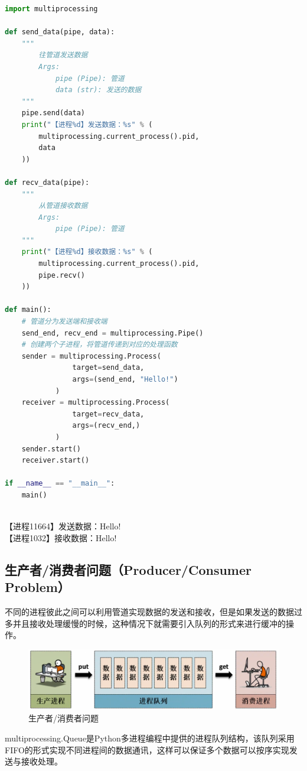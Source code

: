 \begin{lstlisting}[language=Python]
import multiprocessing

def send_data(pipe, data):
	"""
		往管道发送数据
		Args:
			pipe (Pipe): 管道
			data (str): 发送的数据
	"""
	pipe.send(data)
	print("【进程%d】发送数据：%s" % (
		multiprocessing.current_process().pid,
		data
	))

def recv_data(pipe):
	"""
		从管道接收数据
		Args:
			pipe (Pipe): 管道
	"""
	print("【进程%d】接收数据：%s" % (
		multiprocessing.current_process().pid, 
		pipe.recv()
	))

def main():
	# 管道分为发送端和接收端
	send_end, recv_end = multiprocessing.Pipe()
	# 创建两个子进程，将管道传递到对应的处理函数
	sender = multiprocessing.Process(
				target=send_data,
				args=(send_end, "Hello!")
			)
	receiver = multiprocessing.Process(
				target=recv_data,
				args=(recv_end,)
			)
	sender.start()
	receiver.start()

if __name__ == "__main__":
	main()
\end{lstlisting}

\begin{tcolorbox}
	 \\
	【进程11664】发送数据：Hello! \\
	【进程1032】接收数据：Hello!
\end{tcolorbox}

\subsection{生产者/消费者问题（Producer/Consumer Problem）}

不同的进程彼此之间可以利用管道实现数据的发送和接收，但是如果发送的数据过多并且接收处理缓慢的时候，这种情况下就需要引入队列的形式来进行缓冲的操作。

\begin{figure}[H]
	\centering
	\includegraphics[scale=0.6]{img/C2/2-5/2.png}
	\caption{生产者/消费者问题}
\end{figure}

multiprocessing.Queue是Python多进程编程中提供的进程队列结构，该队列采用FIFO的形式实现不同进程间的数据通讯，这样可以保证多个数据可以按序实现发送与接收处理。 \\

